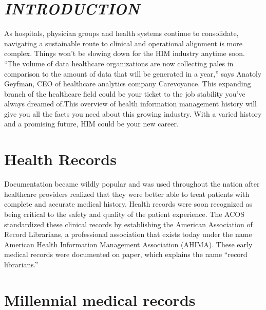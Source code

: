 \documentclass[12pt]{article}
\begin{document}




\tableofcontents
\newpage


\section {\textsl{\textbf{INTRODUCTION}}}

As hospitals, physician groups and health systems continue to consolidate, navigating a sustainable route to clinical and operational alignment is more complex. Things won’t be slowing down for the HIM industry anytime soon. “The volume of data healthcare organizations are now collecting pales in comparison to the amount of data that will be generated in a year,” says Anatoly Geyfman, CEO of healthcare analytics company Carevoyance. \newline\newline
 This expanding branch of the healthcare field could be your ticket to the job stability you’ve always dreamed of.This overview of health information management history will give you all the facts you need about this growing industry. With a varied history and a promising future, HIM could be your new career.





\section{Health Records}


Documentation became wildly popular and was used throughout the nation after healthcare providers realized that they were better able to treat patients with complete and accurate medical history. Health records were soon recognized as being critical to the safety and quality of the patient experience.\newline\newline
 The ACOS standardized these clinical records by establishing the American Association of Record Librarians, a professional association that exists today under the name American Health Information Management Association (AHIMA). These early medical records were documented on paper, which explains the name “record librarians.”

\section{Millennial medical records}
\end{document}
